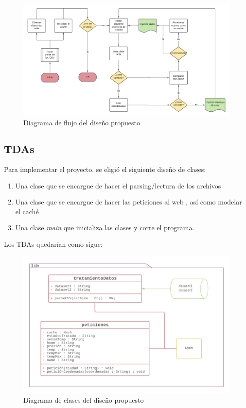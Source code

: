 \documentclass[11 pt]{article}
\theoremstyle{remark}
\begin{document}
	\begin{figure}[h]
		\centering
   	\includegraphics[scale=0.5]{fig2}
		\caption{\small Diagrama de flujo del diseño propuesto}
	\end{figure}
	
	\subsection{TDAs}
	
		Para implementar el proyecto, se eligió el siguiente diseño de clases:
		
		\begin{enumerate}
			\item Una clase que se encargue de hacer el parsing/lectura de los archivos 
		
			\item Una clase que se encargue de hacer las peticiones al web , así como modelar el caché
	
			\item Una clase \emph{main} que inicializa las clases y corre el programa.
		\end{enumerate}
	
		Los TDAs quedarían como sigue:
	
		\begin{figure}[h]
			\centering
   		\includegraphics[scale=0.6]{fig3}
			\caption{\small Diagrama de clases del diseño propuesto}
		\end{figure}
	
\end{document}
